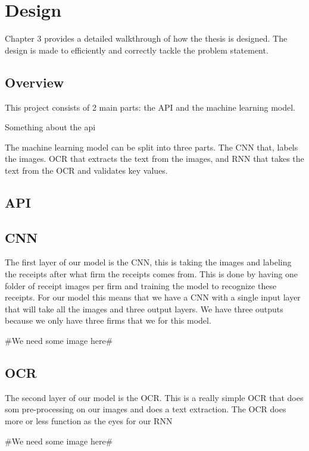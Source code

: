 \chapter{Design}
\label{ch:design}
Chapter 3 provides a detailed walkthrough of how the thesis is designed.
The design is made to efficiently and correctly tackle the problem statement.


\section{Overview}\label{sec:Overview}

This project consists of 2 main parts: the API and the machine learning model.

Something about the api

The machine learning model can be split into three parts.
The CNN that, labels the images.
OCR that extracts the text from the images, and RNN that takes the text from the OCR and validates key values.


\section{API}\label{sec:API}


\section{CNN}\label{sec:CNN}

The first layer of our model is the CNN, this is taking the images and labeling the receipts after what firm the receipts comes from.
This is done by having one folder of receipt images per firm and training the model to recognize these receipts.
For our model this means that we have a CNN with a single input layer that will take all the images and three output layers.
We have three outputs because we only have three firms that we for this model.

#We need some image here#
\section{OCR}\label{sec:OCR}

The second layer of our model is the OCR. This is a really simple OCR that does som pre-processing on our images and does a text extraction.
The OCR does more or less function as the eyes for our RNN

#We need some image here#